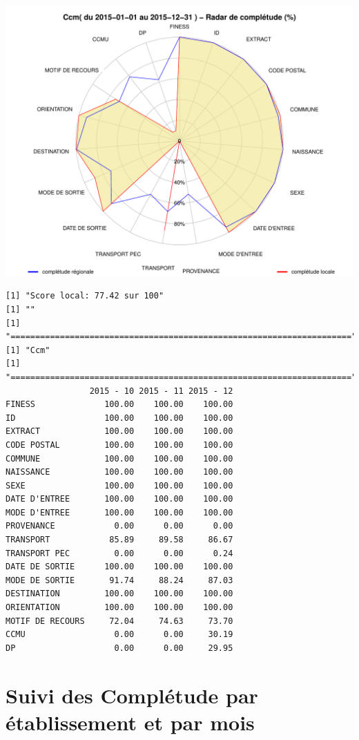 \documentclass[]{article}
\begin{document}
\includegraphics{completude_files/figure-latex/finess-19.pdf}

\begin{verbatim}
[1] "Score local: 77.42 sur 100"
[1] ""
[1] "====================================================================="
[1] "Ccm"
[1] "====================================================================="
                 2015 - 10 2015 - 11 2015 - 12
FINESS              100.00    100.00    100.00
ID                  100.00    100.00    100.00
EXTRACT             100.00    100.00    100.00
CODE POSTAL         100.00    100.00    100.00
COMMUNE             100.00    100.00    100.00
NAISSANCE           100.00    100.00    100.00
SEXE                100.00    100.00    100.00
DATE D'ENTREE       100.00    100.00    100.00
MODE D'ENTREE       100.00    100.00    100.00
PROVENANCE            0.00      0.00      0.00
TRANSPORT            85.89     89.58     86.67
TRANSPORT PEC         0.00      0.00      0.24
DATE DE SORTIE      100.00    100.00    100.00
MODE DE SORTIE       91.74     88.24     87.03
DESTINATION         100.00    100.00    100.00
ORIENTATION         100.00    100.00    100.00
MOTIF DE RECOURS     72.04     74.63     73.70
CCMU                  0.00      0.00     30.19
DP                    0.00      0.00     29.95
\end{verbatim}

\section{Suivi des Complétude par établissement et par
mois}\label{suivi-des-completude-par-etablissement-et-par-mois}
\end{document}
